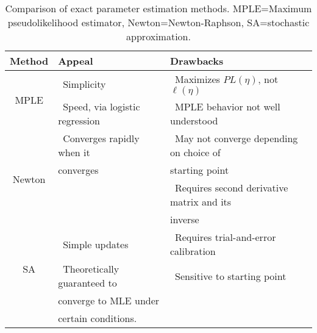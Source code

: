 \begin{table}[h] 
\caption[Comparison of exact parameter estimation methods]{Comparison of exact parameter estimation methods. MPLE=Maximum pseudolikelihood estimator, Newton=Newton-Raphson,
SA=stochastic approximation.}
\begin{tabular}{|c|l|l|}
\hline 
Method & Appeal & Drawbacks \\ [1ex]
\hline
\multirow{2}{0.5in}{MPLE}		
& 	\textbullet \, Simplicity 				  	& \textbullet \, Maximizes $PL(\eta)$, not $\ell(\eta)$  \\
& 	\textbullet \, Speed, via logistic regression 	& \textbullet \, MPLE behavior not well understood \\ [1ex]
\hline
\multirow{4}{0.5in}{Newton}
& 	\textbullet \, Converges rapidly when it   	& \textbullet \, May not converge depending on choice of\\ 
& 	converges 	& starting point \\				
&				& \textbullet \, Requires second derivative matrix and its\\
&				& inverse \\[1ex]
\hline
\multirow{3}{0.5in}{SA} 		
& 	\textbullet \, Simple updates 				& \textbullet \, Requires trial-and-error calibration  \\			& 	\textbullet \, Theoretically guaranteed to		& \textbullet \, Sensitive to starting point \\
& 	converge to MLE under  & \\
& 	certain conditions.  & \\[1ex]
\hline 
\end{tabular} 
\label{T:Compare estimation}
\end{table}

